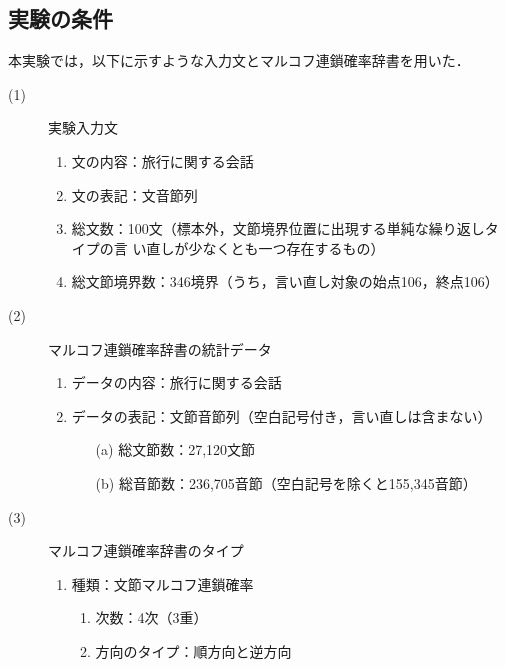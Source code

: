 \subsection{実験の条件}
本実験では，以下に示すような入力文とマルコフ連鎖確率辞書を用いた．
\bigskip
\begin{description}
\item[(1)] 実験入力文  
\Vspace
\renewcommand{\labelenumi}{}
\begin{enumerate}
\item 文の内容：旅行に関する会話
\item 文の表記：文音節列
\item 総文数：100文（標本外，文節境界位置に出現する単純な繰り返しタイプの言
い直しが少なくとも一つ存在するもの）
\item 総文節境界数：346境界（うち，言い直し対象の始点106，終点106）
\end{enumerate}
\Vspace
\newpage
\item[(2)] マルコフ連鎖確率辞書の統計データ  
\Vspace
\begin{enumerate}
\item データの内容：旅行に関する会話
\item データの表記：文節音節列（空白記号付き，言い直しは含まない）
  \begin{enumerate}
  \item[(a)] 総文節数：27,120文節
  \item[(b)] 総音節数：236,705音節（空白記号を除くと155,345音節）
  \end{enumerate}
\end{enumerate}
\Vspace
\item[(3)] マルコフ連鎖確率辞書のタイプ
\Vspace
\renewcommand{\labelenumi}{}
\begin{enumerate}
\item 種類：文節マルコフ連鎖確率 
\Vspace
\begin{enumerate}
\item 次数：4次（3重）
\item 方向のタイプ：順方向と逆方向
\end{enumerate}
\end{enumerate}
\end{description}
